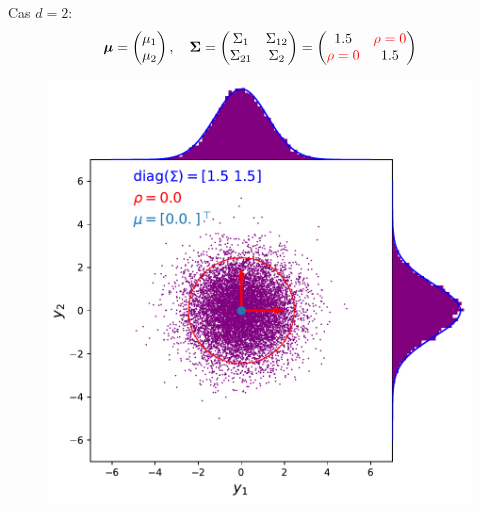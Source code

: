 \documentclass[xcolor=svgnames, t]{beamer}
\newcommand{\vectorx}[1]{\boldsymbol{\MakeLowercase{\mathbf{#1}}}}
\newcommand{\matrixx}[1]{\boldsymbol{\MakeUppercase{#1}}}
\begin{document}
\begin{frame}
  Cas $d=2$:
  \begin{equation*}
    \vectorx{\mu}
    =
    \begin{pmatrix}
      \mu_1 \\
      \mu_2
    \end{pmatrix},
    \quad
    \matrixx{\Sigma}
    =
      \begin{pmatrix}
        \Sigma_{1} & \Sigma_{12} \\
        \Sigma_{21} & \Sigma_{2}
      \end{pmatrix}
    =
      \begin{pmatrix}
        1.5 & \color{red}\rho = 0 \\
        \color{red}\rho = 0 & 1.5
      \end{pmatrix}
  \end{equation*}
% 
  \begin{figure}
    \includegraphics[scale=0.4]{gaussian_2d_rho_null.pdf}
  \end{figure}
\end{frame}
\end{document}

